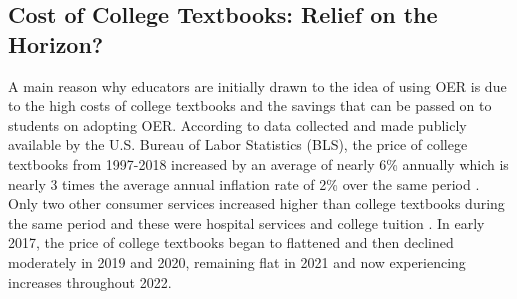 \documentclass[11pt]{article}
\newcommand{\alink}[2]{\href{#1}{\textcolor{blue}{#2}}}
\begin{document}
\subsection{Cost of College Textbooks: Relief on the Horizon?}
A main reason why educators are initially drawn to the idea of using OER is due to the high costs of college textbooks and the savings that can be passed on to students on adopting OER.  According to data collected and made publicly available by the U.S. Bureau of Labor Statistics (BLS), the price of college textbooks from 1997-2018 increased by an average of nearly 6\% annually which is nearly 3 times the average annual inflation rate of 2\% over the same period \cite{bls}. Only two other consumer services increased higher than college textbooks during the same period and these were hospital services and college tuition \cite{perry2018, perry2022}. %
In early 2017, the price of college textbooks began to flattened and then declined moderately in 2019 and 2020, remaining flat in 2021 and now experiencing increases throughout 2022.
\end{document}
